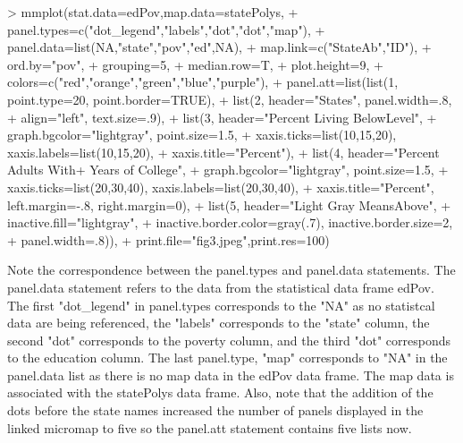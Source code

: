 \documentclass{article}
\begin{document}
\begin{Schunk}
\begin{Sinput}
> mmplot(stat.data=edPov,map.data=statePolys,
+ panel.types=c("dot_legend","labels","dot","dot","map"),
+ panel.data=list(NA,"state","pov","ed",NA),
+ map.link=c("StateAb","ID"),
+ ord.by="pov", 
+ grouping=5, 
+ median.row=T,
+ plot.height=9, 
+ colors=c("red","orange","green","blue","purple"),
+ panel.att=list(list(1, point.type=20, point.border=TRUE),
+ list(2, header="States", panel.width=.8, 
+ align="left", text.size=.9),
+ list(3, header="Percent Living Below\nPoverty Level",
+ graph.bgcolor="lightgray", point.size=1.5,
+ xaxis.ticks=list(10,15,20), xaxis.labels=list(10,15,20),
+ xaxis.title="Percent"),
+ list(4, header="Percent Adults With+ Years of College",
+ graph.bgcolor="lightgray", point.size=1.5,
+ xaxis.ticks=list(20,30,40), xaxis.labels=list(20,30,40), 
+ xaxis.title="Percent", left.margin=-.8, right.margin=0),
+ list(5, header="Light Gray Means\nHighlighted Above",
+ inactive.fill="lightgray",     
+ inactive.border.color=gray(.7), inactive.border.size=2, 
+ panel.width=.8)),
+ print.file="fig3.jpeg",print.res=100)
\end{Sinput}
\end{Schunk}

Note the correspondence between the panel.types and panel.data  statements.  The panel.data statement refers to the data from the statistical data frame edPov.  The first "dot\_legend" in panel.types corresponds to the "NA" as no statistcal data are being referenced, the "labels" corresponds to the "state" column, the second "dot" corresponds to the poverty column, and the third "dot" corresponds to the education column.  The last panel.type, "map" corresponds to "NA" in the panel.data list as there is no map data in the edPov data frame.  The map data is associated with the statePolys data frame. Also, note that the addition of the dots before the state names increased the number of panels displayed in the linked micromap to five so the panel.att statement contains five lists now.
\end{document}
